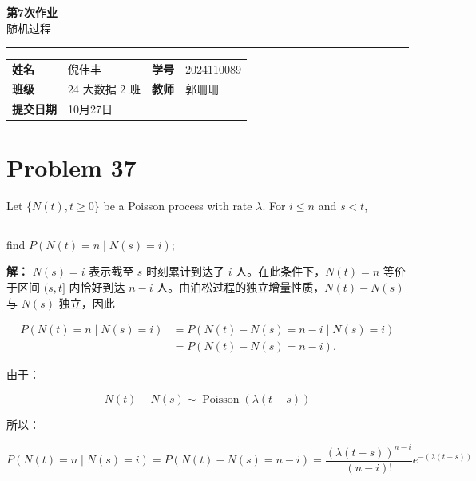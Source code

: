 \documentclass[12pt,a4paper]{article}
\newcommand{\course}{随机过程}
\newcommand{\homeworktitle}{第7次作业}
\newcommand{\studentname}{倪伟丰}
\newcommand{\studentid}{2024110089}
\newcommand{\classname}{24 大数据 2 班}
\newcommand{\teacher}{郭珊珊}
\newcommand{\duedate}{10月27日} %
\begin{document}
\begin{center}
  {\Huge\bfseries\color{mainblue}\homeworktitle}\\[0.6em]
  {\Large\course}\\[1.2em]
  {\color{linegray}\rule{0.9\textwidth}{0.8pt}}
\end{center}

\begin{infobox}
\begin{tabularx}{\linewidth}{>{\bfseries}p{2.2cm} X >{\bfseries}p{2.2cm} X}
姓名 & \studentname & 学号 & \studentid \\
班级 & \classname & 教师 & \teacher \\
提交日期 & \duedate &  &  \\
\end{tabularx}
\end{infobox}


\section{Problem 37}

Let $\{N(t), t \ge 0\}$ be a Poisson process with rate $\lambda$. For $i \le n$ and $s < t$,

\subsection{}
find $P(N(t)=n \mid N(s)=i)$;

\begin{answerbox}
\textbf{解：}
$N(s)=i$ 表示截至 $s$ 时刻累计到达了 $i$ 人。在此条件下，$N(t)=n$ 等价于区间 $(s,t]$ 内恰好到达 $n-i$ 人。由泊松过程的独立增量性质，$N(t)-N(s)$ 与 $N(s)$ 独立，因此

$$
\begin{aligned}
P(N(t)=n\mid N(s)=i)
&=P(N(t)-N(s)=n-i\mid N(s)=i)\\
&=P(N(t)-N(s)=n-i).
\end{aligned}
$$

由于：

$$
N(t)- N(s) \sim \operatorname{Poisson}(\lambda (t-s))
$$

所以：

$$
P(N(t)=n \mid N(s)=i) = P(N(t)- N(s)=n-i)=\frac{(\lambda (t-s))^{n-i}}{(n-i)!}e^{-(\lambda (t-s))}
$$

\end{answerbox}
\end{document}
